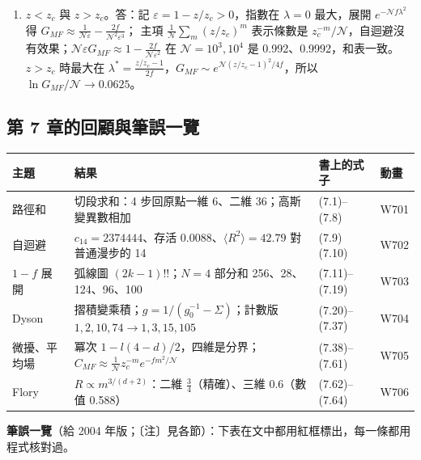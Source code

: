 {\begin{enumerate}[label=\textbf{7.\arabic*},itemsep=0.05em]
（$fm^2/\mathcal N=1$ 時相對修正約 $\frac1m$：表裡的 0.3385、0.3643、0.3675 比 $e^{-1}$ 小 8.0\%、1.0\%、0.1\%）。
\item $z<z_c$ 與 $z>z_c$。\quad 答：記 $\varepsilon=1-z/z_c>0$，指數在 $\lambda=0$ 最大，展開 $e^{-\mathcal Nf\lambda^2}$ 得 $G_{MF}\approx\frac{1}{\mathcal N\varepsilon}-\frac{2f}{\mathcal N^2\varepsilon^3}$；
主項 $\frac1{\mathcal N}\sum_m(z/z_c)^m$ 表示條數是 $z_c^{-m}/\mathcal N$，自迴避沒有效果；$\mathcal N\varepsilon G_{MF}\approx1-\frac{2f}{\mathcal N\varepsilon^2}$ 在 $\mathcal N=10^3,10^4$ 是 0.992、0.9992，和表一致。
$z>z_c$ 時最大在 $\lambda^*=\frac{z/z_c-1}{2f}$，$G_{MF}\sim e^{\mathcal N(z/z_c-1)^2/4f}$，所以 $\ln G_{MF}/\mathcal N\to0.0625$。
\end{enumerate}}

\subsection{第 7 章的回顧與筆誤一覽}
\begin{center}
\small\setlength{\tabcolsep}{4pt}
\begin{tabular}{@{}llll@{}}
\toprule
主題 & 結果 & 書上的式子 & 動畫\\
\midrule
路徑和 & 切段求和：4 步回原點一維 6、二維 36；高斯變異數相加 & (7.1)--(7.8) & W701\\
自迴避 & $c_{14}=2374444$、存活 0.0088、$\langle R^2\rangle=42.79$ 對普通漫步的 14 & (7.9)(7.10) & W702\\
$1-f$ 展開 & 弧線圖 $(2k-1)!!$；$N=4$ 部分和 256、28、124、96、100 & (7.11)--(7.19) & W703\\
Dyson & 摺積變乘積；$g=1/(g_0^{-1}-\Sigma)$；計數版 $1,2,10,74\to1,3,15,105$ & (7.20)--(7.37) & W704\\
微擾、平均場 & 冪次 $1-l(4-d)/2$，四維是分界；$C_{MF}\approx\frac1{\mathcal N}z_c^{-m}e^{-fm^2/\mathcal N}$ & (7.38)--(7.61) & W705\\
Flory & $R\propto m^{3/(d+2)}$：二維 $\frac34$（精確）、三維 0.6（數值 0.588） & (7.62)--(7.64) & W706\\
\bottomrule
\end{tabular}
\end{center}
\textbf{筆誤一覽}（給 2004 年版；〔注〕見各節）：下表在文中都用紅框標出，每一條都用程式核對過。
\begin{center}
\footnotesize\renewcommand{\arraystretch}{0.9}
\SevenTabErrata
\end{center}
